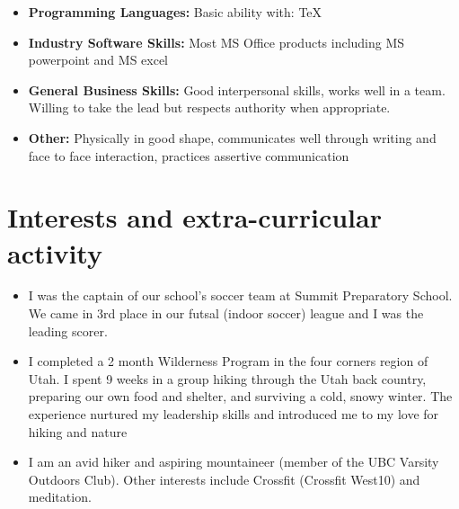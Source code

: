 \documentclass[11pt,a4paper,sans]{moderncv}        %
\begin{document}
\vspace{6pt}

\begin{itemize}

\item \textbf{Programming Languages:} Basic ability with: TeX

\vspace{6pt}

\item \textbf{Industry Software Skills:} Most MS Office products including MS powerpoint and MS excel

\vspace{6pt}

\item \textbf{General Business Skills:} Good interpersonal skills, works well in a team. Willing to take the lead but respects authority when appropriate.

\vspace{6pt}

\item \textbf{Other:} Physically in good shape, communicates well through writing and face to face interaction, practices assertive communication

\end{itemize}

\section{Interests and extra-curricular activity}

\vspace{6pt}

\begin{itemize}

\item{I was the captain of our school's soccer team at Summit Preparatory School. We came in 3rd place in our futsal (indoor soccer) league and I was the leading scorer. }

\vspace{6pt}

\item{I completed a 2 month Wilderness Program in the four corners region of Utah. I spent 9 weeks in a group hiking through the Utah back country, preparing our own food and shelter, and surviving a cold, snowy winter. The experience nurtured my leadership skills and introduced me to my love for hiking and nature}

\vspace{6pt}

\item{I am an avid hiker and aspiring mountaineer (member of the UBC Varsity Outdoors Club). Other interests include Crossfit (Crossfit West10) and meditation.}

\end{itemize}
\end{document}
